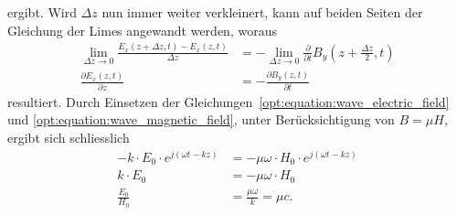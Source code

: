 ergibt.
Wird $\Delta z$ nun immer weiter verkleinert, kann auf beiden Seiten der Gleichung der Limes angewandt werden, woraus
\begin{align}
\lim_{\Delta z \to 0} \frac{E_x(z+\Delta z,t) - E_x(z,t)}{\Delta z}
&=
-\lim_{\Delta z \to 0} \frac{\partial}{\partial t} B_y\left(z+\frac{\Delta z}{2},t\right)
\\
\frac{\partial E_x(z,t)}{\partial z}
&=
-\frac{\partial B_y(z,t)}{\partial t}
\label{opt:equation:differential_induction}
\end{align}
resultiert.
Durch Einsetzen der Gleichungen~\ref{opt:equation:wave_electric_field} und \ref{opt:equation:wave_magnetic_field}, unter Berücksichtigung von $B = \mu H$, ergibt sich schliesslich
\begin{align}
-k \cdot E_0 \cdot e^{j(\omega t-k z)}
&=
-\mu \omega \cdot H_0 \cdot e^{j(\omega t-k z)}
\\
k \cdot E_0
&=
-\mu \omega \cdot H_0
\\
\frac{E_0}{H_0}
&=
\frac{\mu \omega}{k}
=
\mu c
.
\end{align}

